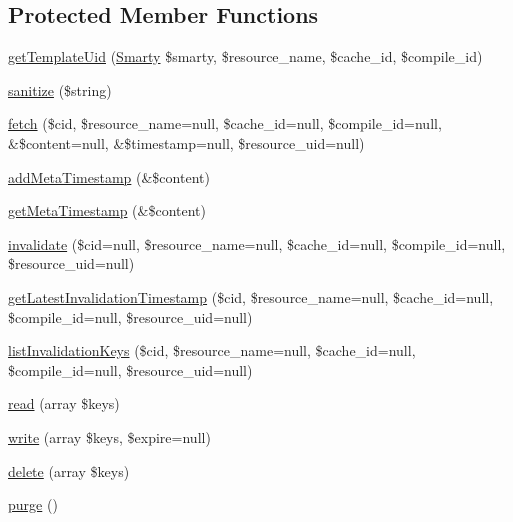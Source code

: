 \subsection*{Protected Member Functions}
\begin{DoxyCompactItemize}
\item 
\hyperlink{class_smarty___cache_resource___key_value_store_a32e584b679ec25a2ec530e4e926641ad}{get\+Template\+Uid} (\hyperlink{class_smarty}{Smarty} \$smarty, \$resource\+\_\+name, \$cache\+\_\+id, \$compile\+\_\+id)
\item 
\hyperlink{class_smarty___cache_resource___key_value_store_a1c6fcac93e6a822bd1f7421b1b19b400}{sanitize} (\$string)
\item 
\hyperlink{class_smarty___cache_resource___key_value_store_a1b6dbb55fdcd9832d0d908eff480507b}{fetch} (\$cid, \$resource\+\_\+name=null, \$cache\+\_\+id=null, \$compile\+\_\+id=null, \&\$content=null, \&\$timestamp=null, \$resource\+\_\+uid=null)
\item 
\hyperlink{class_smarty___cache_resource___key_value_store_a3a893a6d30d78eeaaa23e549e4b77a0b}{add\+Meta\+Timestamp} (\&\$content)
\item 
\hyperlink{class_smarty___cache_resource___key_value_store_ada696a59d9d13c9337cdb5db8ac6a532}{get\+Meta\+Timestamp} (\&\$content)
\item 
\hyperlink{class_smarty___cache_resource___key_value_store_a5c78dd7a89ac217eb644a4a3622180a7}{invalidate} (\$cid=null, \$resource\+\_\+name=null, \$cache\+\_\+id=null, \$compile\+\_\+id=null, \$resource\+\_\+uid=null)
\item 
\hyperlink{class_smarty___cache_resource___key_value_store_ac2869042f0c313061a3dfa064fbb1a99}{get\+Latest\+Invalidation\+Timestamp} (\$cid, \$resource\+\_\+name=null, \$cache\+\_\+id=null, \$compile\+\_\+id=null, \$resource\+\_\+uid=null)
\item 
\hyperlink{class_smarty___cache_resource___key_value_store_a29087f10121cd4646e7c719109b87546}{list\+Invalidation\+Keys} (\$cid, \$resource\+\_\+name=null, \$cache\+\_\+id=null, \$compile\+\_\+id=null, \$resource\+\_\+uid=null)
\item 
\hyperlink{class_smarty___cache_resource___key_value_store_a22b42d6b1291b3a59c1e457c0d4727a5}{read} (array \$keys)
\item 
\hyperlink{class_smarty___cache_resource___key_value_store_a914ddd5bfb233d53b6413ec9d51dcd99}{write} (array \$keys, \$expire=null)
\item 
\hyperlink{class_smarty___cache_resource___key_value_store_a9959a1c2ba36e72aee7f974df28b60d1}{delete} (array \$keys)
\item 
\hyperlink{class_smarty___cache_resource___key_value_store_ac400be513972a68ea08ef845d5b16824}{purge} ()
\end{DoxyCompactItemize}

